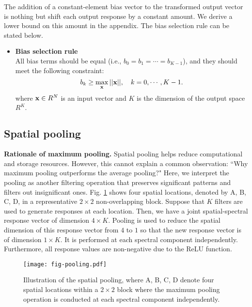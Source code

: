 \documentclass[preprint,12pt]{elsarticle}
\begin{document}
The addition of a constant-element bias vector to the transformed output
vector is nothing but shift each output response by a constant amount.
We derive a lower bound on this amount in the appendix.  The bias
selection rule can be stated below.
\begin{itemize}
\item {\bf Bias selection rule} \\
All bias terms should be equal (i.e., $b_0=b_1= \cdots = b_{K-1}$), 
and they should meet the following constraint:
\begin{equation}\label{eq:d3}
b_k \ge \max_{\bf x} || {\bf x} ||, \quad k=0, \cdots, K-1.
\end{equation}
where ${\bf x} \in R^N$ is an input vector and $K$ is the dimension 
of the output space $R^K$. 
\end{itemize}

\subsection{Spatial pooling}\label{subsec:pooling} 

{\bf Rationale of maximum pooling.} Spatial pooling helps reduce
computational and storage resources.  However, this cannot explain a
common observation: ``Why maximum pooling outperforms the average
pooling?" Here, we interpret the pooling as another filtering operation
that preserves significant patterns and filters out insignificant ones.
Fig.  \ref{fig:pooling} shows four spatial locations, denoted by A, B,
C, D, in a representative $2 \times 2$ non-overlapping block. Suppose
that $K$ filters are used to generate responses at each location.  Then,
we have a joint spatial-spectral response vector of dimension $4 \times
K$.  Pooling is used to reduce the spatial dimension of this response
vector from $4$ to $1$ so that the new response vector is of dimension
$1 \times K$.  It is performed at each spectral component independently.
Furthermore, all response values are non-negative due to the ReLU
function. 

\begin{figure}[htb]
\centering
\texttt{[image: fig-pooling.pdf]}
\caption{Illustration of the spatial pooling, where A, B, C, D denote four
spatial locations within a $2 \times 2$ block where the maximum pooling
operation is conducted at each spectral component independently.}\label{fig:pooling}
\end{figure}
\end{document}
